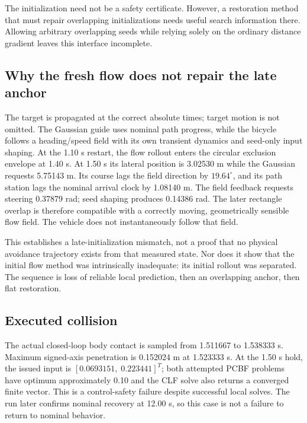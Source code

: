 \documentclass[11pt]{article}
\begin{document}
The initialization need not be a safety certificate. However, a restoration
method that must repair overlapping initializations needs useful search
information there. Allowing arbitrary overlapping seeds while relying solely
on the ordinary distance gradient leaves this interface incomplete.

\subsection{Why the fresh flow does not repair the late anchor}
The target is propagated at the correct absolute times; target motion is
not omitted. The Gaussian guide uses nominal path progress, while the
bicycle follows a heading/speed field with its own transient dynamics and
seed-only input shaping. At the 1.10 s restart, the flow rollout enters the
circular exclusion envelope at 1.40 s. At 1.50 s its lateral position is
3.02530 m while the Gaussian requests 5.75143 m. Its course lags the field
direction by $19.64^\circ$, and its path station lags the nominal arrival
clock by 1.08140 m. The field feedback requests steering 0.37879 rad;
seed shaping produces 0.14386 rad. The later rectangle overlap is therefore
compatible with a correctly moving, geometrically sensible flow field.
The vehicle does not instantaneously follow that field.

This establishes a late-initialization mismatch, not a proof that no
physical avoidance trajectory exists from that measured state. Nor does it
show that the initial flow method was intrinsically inadequate: its initial
rollout was separated. The sequence is loss of reliable local prediction,
then an overlapping anchor, then flat restoration.

\subsection{Executed collision}
The actual closed-loop body contact is sampled from 1.511667 to 1.538333 s.
Maximum signed-axis penetration is 0.152024 m at 1.523333 s. At the 1.50 s
hold, the issued input is $[0.0693151,\;0.223441]^T$; both attempted PCBF
problems have optimum approximately 0.10 and the CLF solve also returns a
converged finite vector. This is a control-safety failure despite successful
local solves. The run later confirms nominal recovery at 12.00 s, so this
case is not a failure to return to nominal behavior.
\end{document}

